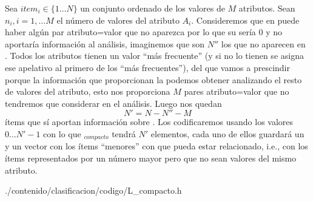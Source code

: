 Sea $item_i \in \{1\ldots N\}$ un conjunto ordenado de los valores de $M$ atributos. Sean $n_i, i=1, \ldots M$ el número de valores del atributo $A_i$. Consideremos que en \D puede haber algún par atributo=valor que no aparezca por lo que su \soporte sería 0 y no aportaría información al análisis, imaginemos que son $N''$ los que no aparecen en \D. Todos los atributos tienen un valor "`más frecuente"' (y si no lo tienen se asigna ese apelativo al primero de los "`más frecuentes"'), del que vamos a prescindir porque la información que proporcionan la podemos obtener analizando el resto de valores del atributo, esto nos proporciona $M$ pares atributo=valor que no tendremos que considerar en el análisis. Luego nos quedan
\[N' = N - N'' - M\]
ítems que sí aportan información sobre \D. Los codificaremos usando los valores $0\ldots N'-1$ con lo que \aprioriL[1]$_{compacto}$ tendrá $N'$ elementos, cada uno de ellos guardará un \soporte y un vector con los ítems "`menores"' con que pueda estar relacionado, i.e., con los ítems representados por un número mayor pero que no sean valores del mismo atributo.


\afterpage{\clearpage}
\lstset{language=C++}

                 {./contenido/clasificacion/codigo/L_compacto.h}
\lstset{language=pseudocodigo}
